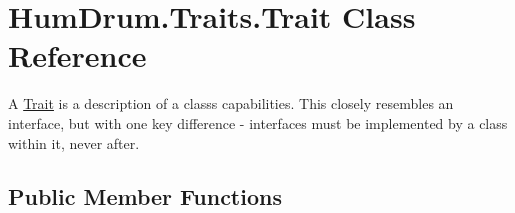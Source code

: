 \hypertarget{classHumDrum_1_1Traits_1_1Trait}{}\section{Hum\+Drum.\+Traits.\+Trait Class Reference}
\label{classHumDrum_1_1Traits_1_1Trait}


A \hyperlink{classHumDrum_1_1Traits_1_1Trait}{Trait} is a description of a class\textquotesingle{}s capabilities. This closely resembles an interface, but with one key difference -\/ interfaces must be implemented by a class within it, never after.  


\subsection*{Public Member Functions}

